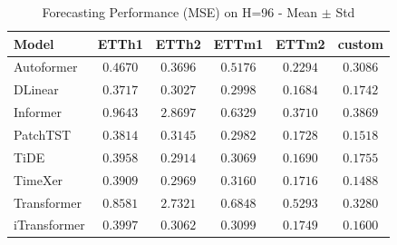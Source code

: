 \begin{table}[t]
\centering
\caption{Forecasting Performance (MSE) on H=96 - Mean $\pm$ Std}
\label{tab:main_results_h96}
\begin{tabular}{lccccc}
\toprule
Model & ETTh1 & ETTh2 & ETTm1 & ETTm2 & custom \\
\midrule
Autoformer & $0.4670$ & $0.3696$ & $0.5176$ & $0.2294$ & $0.3086$ \\
DLinear & $0.3717$ & $0.3027$ & $0.2998$ & $0.1684$ & $0.1742$ \\
Informer & $0.9643$ & $2.8697$ & $0.6329$ & $0.3710$ & $0.3869$ \\
PatchTST & $0.3814$ & $0.3145$ & $0.2982$ & $0.1728$ & $0.1518$ \\
TiDE & $0.3958$ & $0.2914$ & $0.3069$ & $0.1690$ & $0.1755$ \\
TimeXer & $0.3909$ & $0.2969$ & $0.3160$ & $0.1716$ & $0.1488$ \\
Transformer & $0.8581$ & $2.7321$ & $0.6848$ & $0.5293$ & $0.3280$ \\
iTransformer & $0.3997$ & $0.3062$ & $0.3099$ & $0.1749$ & $0.1600$ \\
\bottomrule
\end{tabular}
\end{table}